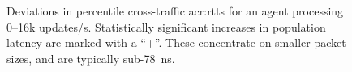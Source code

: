 \begin{figure}
	\centering
		\caption[Deviations in  percentile cross-traffic RTTs for an \approachshort{} agent processing \numrange{0}{16}k updates/s.]{Deviations in  percentile cross-traffic \glspl{acr:rtt} for an \approachshort{} agent processing \numrange{0}{16}k updates/s. Statistically significant increases in population latency are marked with a ``+''. These concentrate on smaller packet sizes, and are typically sub-\qty{78}{\nano\second}.\label{fig:dataplane-heat}}
\end{figure}

